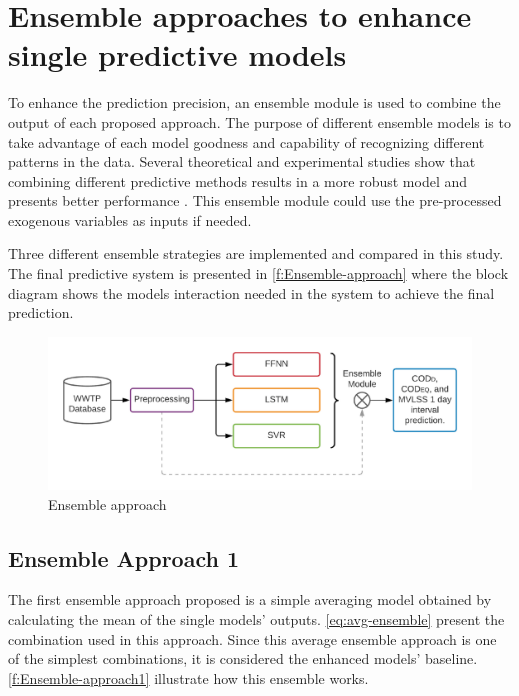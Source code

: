 \section{Ensemble approaches to enhance single predictive models}
\label{s:Ensembles}

To enhance the prediction precision, an ensemble module is used to combine the output of each proposed approach. The purpose of different ensemble models is to take advantage of each model goodness and capability of recognizing different patterns in the data. Several theoretical and experimental studies show that combining different predictive methods results in a more robust model and presents better performance \cite{Nourani2021}. This ensemble module could use the pre-processed exogenous variables as inputs if needed.

Three different ensemble strategies are implemented and compared in this study. The final predictive system is presented in \autoref{f:Ensemble-approach} where the block diagram shows the models interaction needed in the system to achieve the final prediction. 

\begin{figure}[h]
\centering
\includegraphics[width=\linewidth]{figures/Ch5/Thesis-Approaches-Ensemble.pdf}
\caption{Ensemble approach}
\label{f:Ensemble-approach}
\end{figure}

\subsection{Ensemble Approach 1}
\label{s:Ensemble-Approach1}
The first ensemble approach proposed is a simple averaging model obtained by calculating the mean of the single models' outputs. \autoref{eq:avg-ensemble} present the combination used in this approach. Since this average ensemble approach is one of the simplest combinations, it is considered the enhanced models' baseline. \autoref{f:Ensemble-approach1} illustrate how this ensemble works.

